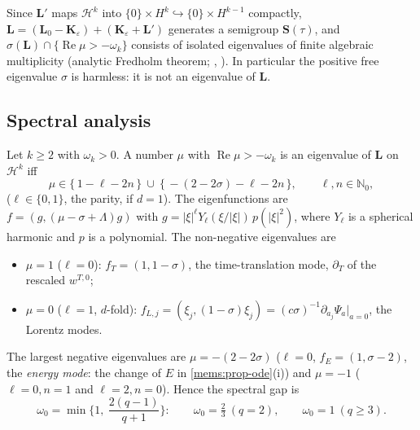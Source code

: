 Since $\mathbf L'$ maps $\mathcal H^k$ into $\{0\}\times H^k\hookrightarrow\{0\}\times H^{k-1}$
compactly, $\mathbf L=(\mathbf L_0-\mathbf K_\varepsilon)+(\mathbf K_\varepsilon+\mathbf L')$
generates a semigroup $\mathbf S(\tau)$, and
$\sigma(\mathbf L)\cap\{\operatorname{Re}\mu>-\omega_k\}$ consists of isolated
eigenvalues of finite algebraic multiplicity (analytic Fredholm theorem;
\cite[IV.5]{Kato1995}, \cite{EngelNagel2000}). In particular the positive free
eigenvalue $\sigma$ is harmless: it is not an eigenvalue of $\mathbf L$.

\subsection{Spectral analysis}
\label{mems:sec-spec}

\begin{proposition}[Spectrum]\label{mems:prop-spec}
Let $k\ge2$ with $\omega_k>0$. A number $\mu$ with $\operatorname{Re}\mu>-\omega_k$ is an
eigenvalue of $\mathbf L$ on $\mathcal H^k$ iff
\begin{equation}\label{mems:eigs}
  \mu\in\{\,1-\ell-2n\,\}\ \cup\ \{\,-(2-2\sigma)-\ell-2n\,\},\qquad \ell,n\in\mathbb N_0,
\end{equation}
($\ell\in\{0,1\}$, the parity, if $d=1$). The eigenfunctions are
$f=(g,(\mu-\sigma+\Lambda)g)$ with $g=|\xi|^\ell Y_\ell(\xi/|\xi|)\,p(|\xi|^2)$,
where $Y_\ell$ is a spherical harmonic and $p$ is a polynomial. The
non-negative eigenvalues are
\begin{itemize}[nosep]
\item $\mu=1$ ($\ell=0$): $f_T=(1,1-\sigma)$, the time-translation mode,
  $\partial_T$ of the rescaled $w^{T,0}$;
\item $\mu=0$ ($\ell=1$, $d$-fold): $f_{L,j}=(\xi_j,(1-\sigma)\xi_j)=(c\sigma)^{-1}\partial_{a_j}\Psi_a|_{a=0}$,
  the Lorentz modes.
\end{itemize}
The largest negative eigenvalues are $\mu=-(2-2\sigma)$ ($\ell=0$, $f_E=(1,\sigma-2)$,
the \emph{energy mode}: the change of $E$ in \cref{mems:prop-ode}(i)) and $\mu=-1$
($\ell=0,n=1$ and $\ell=2,n=0$). Hence the spectral gap is
\begin{equation}\label{mems:gap}
  \omega_0=\min\Big\{1,\ \frac{2(q-1)}{q+1}\Big\}:\qquad
  \omega_0=\tfrac23\ (q=2),\qquad \omega_0=1\ (q\ge3).
\end{equation}
\end{proposition}

